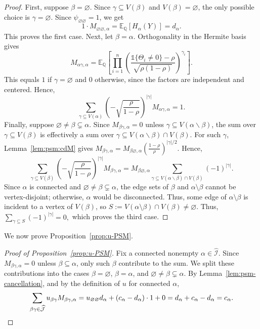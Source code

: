 \documentclass[11pt, letterpaper]{article}
\numberwithin{equation}{section}
\newcommand{\E}{\mathbb{E}}
\newcommand{\QQ}{\mathbb{Q}}
\newcommand{\goodI}{\widehat{\mathcal{I}}}
\begin{document}
\begin{proof}
    First, suppose $\beta=\varnothing$. Since $\gamma \subseteq V(\beta)$ and $V(\beta)=\varnothing$, the only possible choice is $\gamma=\varnothing$. Since $\psi_{\varnothing \varnothing}=1$, we get 
    \[1\cdot M_{\varnothing\varnothing,\alpha}=\E_\QQ[H_\alpha(Y)]=d_\alpha.\]
    This proves the first case. Next, let $\beta=\alpha$.  Orthogonality in the Hermite basis gives
\[
M_{\alpha\gamma,\alpha}
=
\E_\QQ\left[\prod_{i=1}^n
\left(\frac{\mathds 1\{\Theta_i\neq0\}-\rho}{\sqrt{\rho(1-\rho)}}\right)^{\gamma_i}\right].
\]
%
This equals $1$ if $\gamma=\varnothing$ and $0$ otherwise, since the factors are independent and centered. Hence,
\[
\sum_{\gamma\subseteq V(\alpha)}
\left(-\sqrt{\frac{\rho}{1-\rho}}\right)^{|\gamma|}
M_{\alpha\gamma,\alpha}=1.
\]
Finally, suppose $\varnothing\neq\beta\subsetneq\alpha$. Since
$M_{\beta\gamma,\alpha}=0$ unless $\gamma\subseteq V(\alpha\backslash\beta)$, the sum over $\gamma\subseteq V(\beta)$ is effectively a sum over $\gamma\subseteq V(\alpha\backslash\beta)\cap V(\beta)$. For such $\gamma$, Lemma~\ref{lem:psm:cdM} gives $M_{\beta\gamma,\alpha}=M_{\beta\varnothing,\alpha}
\left(\frac{1-\rho}{\rho}\right)^{|\gamma|/2}.$
Hence,
\[
\sum_{\gamma\subseteq V(\beta)}
\left(-\sqrt{\frac{\rho}{1-\rho}}\right)^{|\gamma|}
M_{\beta\gamma,\alpha}=
M_{\beta\varnothing,\alpha}
\sum_{\gamma\subseteq V(\alpha\backslash\beta)\cap V(\beta)}
(-1)^{|\gamma|}.
\]
Since $\alpha$ is connected and $\varnothing\neq\beta\subsetneq\alpha$, the
edge sets of $\beta$ and $\alpha\setminus\beta$ cannot be vertex-disjoint;
otherwise, $\alpha$ would be disconnected. Thus, some edge of
$\alpha\setminus\beta$ is incident to a vertex of $V(\beta)$, so $S:=V(\alpha\setminus\beta)\cap V(\beta)\neq\varnothing.$
Thus,
$\sum_{\gamma\subseteq S}(-1)^{|\gamma|}=0,$
which proves the third case.
\end{proof}
\noindent We now prove Proposition~\ref{prop:u-PSM}.
\begin{proof}[Proof of Proposition~\ref{prop:u-PSM}]
Fix a connected nonempty $\alpha\in \goodI$. Since $M_{\beta\gamma,\alpha}=0$ unless $\beta\subseteq\alpha$, only such $\beta$ contribute to the sum. We split these contributions into the cases $\beta=\varnothing$, $\beta=\alpha$, and $\varnothing\neq\beta\subsetneq\alpha$. By Lemma~\ref{lem:psm-cancellation}, and by the definition of $u$ for connected $\alpha$,
\[\sum_{\beta\gamma\in\widehat{\mathcal J}} u_{\beta\gamma}M_{\beta\gamma,\alpha}=u_{\varnothing\varnothing}d_\alpha+(c_\alpha-d_\alpha)\cdot 1+0=d_\alpha+c_\alpha-d_\alpha=c_\alpha. \qedhere
\]
\end{proof}
\end{document}
